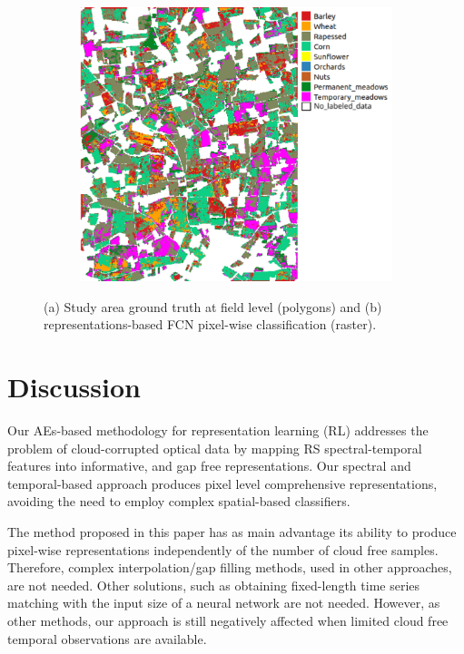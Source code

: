 \documentclass[journal,article,submit,pdftex,moreauthors]{Definitions/mdpi}
\begin{document}
\begin{figure}[H]
	\begin{subfigure}[t]{0.5\linewidth}
		\centering
		\includegraphics[height=0.6\linewidth,width=0.85\linewidth]{figures/classification_2017_2018_with_labels_2.pdf}
	  \caption{}
	  \label{fig:classification_map}
	\end{subfigure}
	\caption{(a) Study area ground truth at field level (polygons) and (b) representations-based FCN pixel-wise classification (raster).}
	\label{fig:maps}
\end{figure}

\section{Discussion}
Our AEs-based methodology for representation learning (RL) addresses the problem of cloud-corrupted optical data by mapping RS spectral-temporal features into informative, and gap free representations.
Our spectral and temporal-based approach produces pixel level comprehensive representations, avoiding the need to employ complex spatial-based classifiers.

The method proposed in this paper has as main advantage its ability to produce pixel-wise representations independently of the number of cloud free samples.
Therefore, complex interpolation/gap filling methods, used in other approaches, are not needed.
Other solutions, such as obtaining fixed-length time series matching with the input size of a neural network are not needed.
However, as other methods, our approach is still negatively affected when limited cloud free temporal observations are available.
\end{document}
